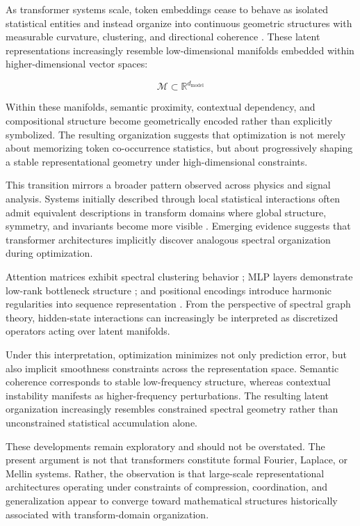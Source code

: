 As transformer systems scale, token embeddings cease to behave as isolated statistical entities and instead organize into continuous geometric structures with measurable curvature, clustering, and directional coherence \cite{elhage2021mathematical,park2024geometry}. These latent representations increasingly resemble low-dimensional manifolds embedded within higher-dimensional vector spaces:

\[
\mathcal{M} \subset \mathbb{R}^{d_{\mathrm{model}}}
\]

Within these manifolds, semantic proximity, contextual dependency, and compositional structure become geometrically encoded rather than explicitly symbolized. The resulting organization suggests that optimization is not merely about memorizing token co-occurrence statistics, but about progressively shaping a stable representational geometry under high-dimensional constraints.

This transition mirrors a broader pattern observed across physics and signal analysis. Systems initially described through local statistical interactions often admit equivalent descriptions in transform domains where global structure, symmetry, and invariants become more visible \cite{bracewell2000fourier}. Emerging evidence suggests that transformer architectures implicitly discover analogous spectral organization during optimization.

Attention matrices exhibit spectral clustering behavior \cite{gabbay2021spectral}; MLP layers demonstrate low-rank bottleneck structure \cite{wang2022transformer}; and positional encodings introduce harmonic regularities into sequence representation \cite{kazemnejad2023impact}. From the perspective of spectral graph theory, hidden-state interactions can increasingly be interpreted as discretized operators acting over latent manifolds.

Under this interpretation, optimization minimizes not only prediction error, but also implicit smoothness constraints across the representation space. Semantic coherence corresponds to stable low-frequency structure, whereas contextual instability manifests as higher-frequency perturbations. The resulting latent organization increasingly resembles constrained spectral geometry rather than unconstrained statistical accumulation alone.

These developments remain exploratory and should not be overstated. The present argument is not that transformers constitute formal Fourier, Laplace, or Mellin systems. Rather, the observation is that large-scale representational architectures operating under constraints of compression, coordination, and generalization appear to converge toward mathematical structures historically associated with transform-domain organization.

